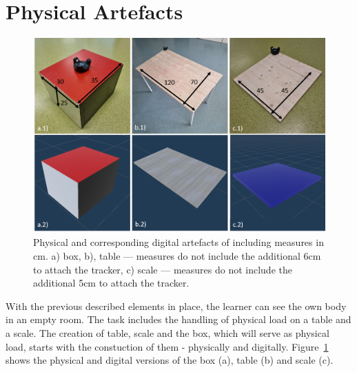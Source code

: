 \section{Physical Artefacts}
\label{sec:artefacts}
\begin{figure}[H]
	\centering
	\includegraphics[width=\textwidth]{figures/artefacts.png}	
	\caption[Artefacts of \exgo]{Physical and corresponding digital artefacts of \exgo including measures in cm. a) box, b), table --- measures do not include the additional 6cm to attach the tracker, c) scale --- measures do not include the additional 5cm to attach the tracker.}
	\label{fig:artefacts}
\end{figure}
With the previous described elements in place, the learner can see the own body in an empty room. The task includes the handling of physical load on a table and a scale. The creation of table, scale and the box, which will serve as physical load, starts with the constuction of them - physically and digitally. Figure~\ref{fig:artefacts} shows the physical and digital versions of the box (a), table (b) and scale (c).\\
